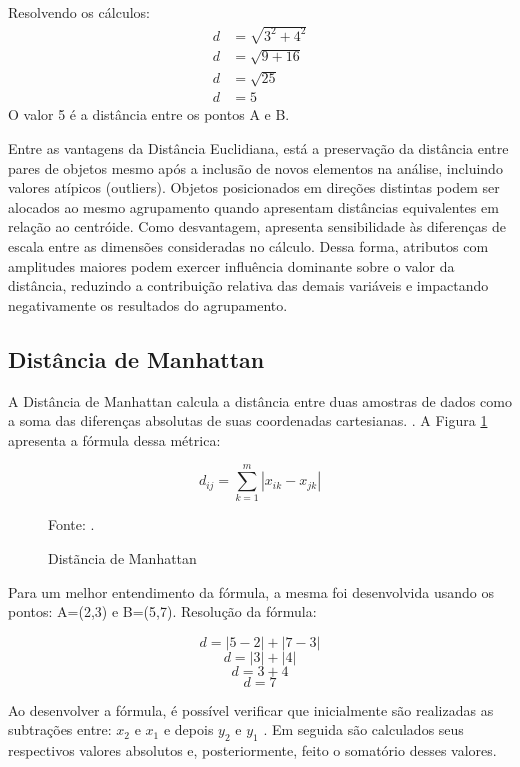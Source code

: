 \documentclass[10pt,a4paper,twocolumn]{article}
\begin{document}
Resolvendo os cálculos: 
\begin{align*}
    d &= \sqrt{3^2 + 4^2} \\
    d &= \sqrt{9 + 16}    \\
    d &= \sqrt{25}        \\
    d &= 5
\end{align*}
O valor 5 é a distância entre os pontos A e B. 

Entre as vantagens da Distância Euclidiana, está a preservação da distância entre pares de objetos mesmo após a inclusão de novos elementos na análise, incluindo valores atípicos (outliers). Objetos posicionados em direções distintas podem ser alocados ao mesmo agrupamento quando apresentam distâncias equivalentes em relação ao centróide. Como desvantagem, apresenta sensibilidade às diferenças de escala entre as dimensões consideradas no cálculo. Dessa forma, atributos com amplitudes maiores podem exercer influência dominante sobre o valor da distância, reduzindo a contribuição relativa das demais variáveis e impactando negativamente os resultados do agrupamento\cite{VelezFalconi2020}.


\subsection{Distância de Manhattan} %
\label{sec:manhattan}

A Distância de Manhattan calcula a distância entre duas amostras de dados como a soma das diferenças absolutas de suas coordenadas cartesianas. \cite{AlKhamees2026}. A Figura \ref{fig:manhattan} apresenta a fórmula dessa métrica:


\begin{figure}[h!]
   \centering
      \[
         d_{ij} = \sum_{k=1}^{m} \left| x_{ik} - x_{jk} \right|
      \]
      \vspace{-0.7cm}
       \caption{Distãncia de Manhattan}
       \label{fig:manhattan}
       \vspace{0.0cm}
       {\small Fonte: \cite{Ferrari2016}.}   
\end{figure}

Para um melhor entendimento da fórmula, a mesma foi desenvolvida usando os pontos: A=(2,3) e B=(5,7). Resolução da fórmula:

\[
d = |5-2| + |7-3|
\]
\[
d = |3| + |4|
\]
\[
d = 3 + 4
\]
\[
d = 7
\] 

Ao desenvolver a fórmula, é possível verificar que inicialmente são realizadas as subtrações entre: \(x_{2}\)  e \(x_{1}\)  e depois \(y_{2}\)  e \(y_{1}\) . Em seguida são calculados seus respectivos valores absolutos e, posteriormente, feito o somatório desses valores. 
\end{document}
